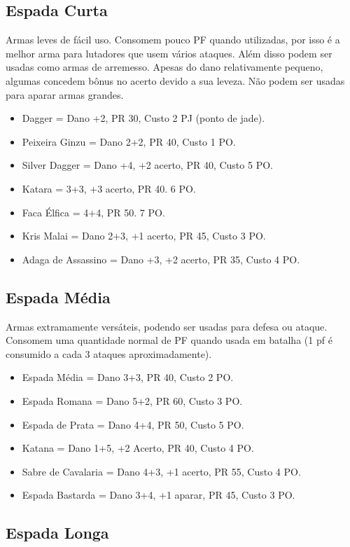 \subsection{Espada Curta}
Armas leves de fácil uso. Consomem pouco PF quando utilizadas, por isso é a melhor arma para lutadores que usem vários ataques. Além disso podem ser usadas como armas de arremesso. Apesas do dano relativamente pequeno, algumas concedem bônus no acerto devido a sua leveza. Não podem ser usadas para aparar armas grandes. 

\begin{itemize}
	\item Dagger = Dano +2, PR 30, Custo 2 PJ (ponto de jade).
	\item Peixeira Ginzu = Dano 2+2, PR 40, Custo 1 PO.
	\item Silver Dagger = Dano +4, +2 acerto, PR 40, Custo 5 PO.
	\item Katara = 3+3, +3 acerto, PR 40. 6 PO.
	\item Faca Élfica = 4+4, PR 50. 7 PO.
	\item Kris Malai = Dano 2+3, +1 acerto, PR 45, Custo 3 PO.
	\item Adaga de Assassino = Dano +3, +2 acerto, PR 35, Custo 4 PO.
\end{itemize}

\subsection{Espada Média}
Armas extramamente versáteis, podendo ser usadas para defesa ou ataque. Consomem uma quantidade normal de PF quando usada em batalha (1 pf é consumido a cada 3 ataques aproximadamente).

\begin{itemize}
	\item Espada Média = Dano 3+3, PR 40, Custo 2 PO.
	\item Espada Romana = Dano 5+2, PR 60, Custo 3 PO.
	\item Espada de Prata = Dano 4+4, PR 50, Custo 5 PO.
	\item Katana = Dano 1+5, +2 Acerto, PR 40, Custo 4 PO.
	\item Sabre de Cavalaria = Dano 4+3, +1 acerto, PR 55, Custo 4 PO.
	\item Espada Bastarda = Dano 3+4, +1 aparar, PR 45, Custo 3 PO.
\end{itemize}

\subsection{Espada Longa}

